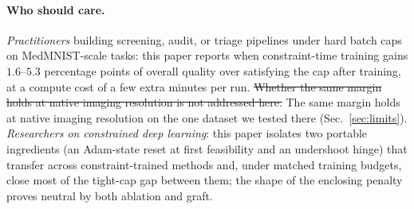 \documentclass[10pt]{article}
\newcommand{\del}[1]{{\color{red}\sout{#1}}}
\begin{document}
\paragraph{Who should care.}
\emph{Practitioners} building screening, audit, or triage pipelines under
hard batch caps on MedMNIST-scale tasks: this paper reports when
constraint-time training gains $1.6$--$5.3$ percentage points of overall
quality over satisfying the cap after training, at a compute cost of a few
extra minutes per run. \del{Whether the same margin holds at native imaging
resolution is not addressed here.}
{\color{blue}The same margin holds at native imaging resolution on the one
dataset we tested there \mbox{(Sec.~\ref{sec:limits})}.}
\emph{Researchers on constrained deep learning}: this paper isolates two
portable ingredients (an Adam-state reset at first feasibility and an
undershoot hinge) that transfer across constraint-trained methods and,
under matched training budgets, close most of the tight-cap gap between
them; the shape of the enclosing penalty proves neutral by both ablation
and graft.
\end{document}
